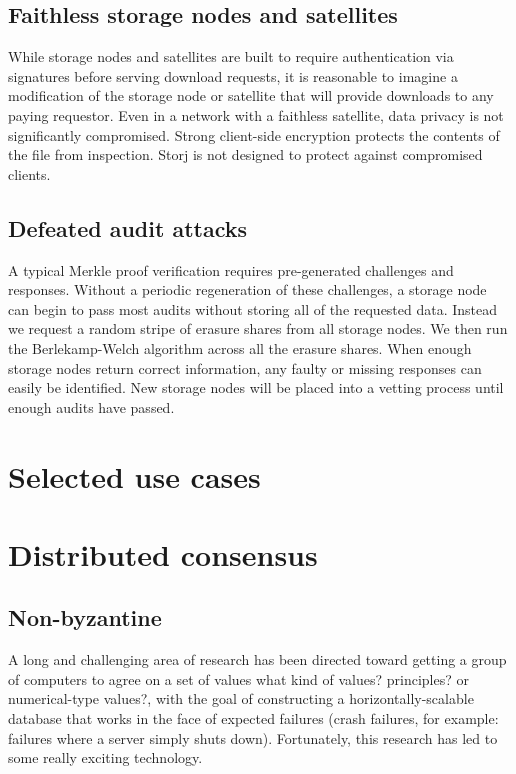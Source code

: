 \documentclass[11pt,fleqn,openany]{book}
\newcommand{\bs}[1]{{\color{red}#1}}
\begin{document}
\section{Faithless storage nodes and satellites}

While storage nodes and satellites are built to require authentication via
signatures before serving download requests, it is reasonable to imagine a
modification of the storage node or satellite that will provide downloads to
any paying requestor.
Even in a network with a faithless satellite, data privacy is not significantly
compromised.
Strong client-side encryption protects the contents of the file from
inspection.
Storj is not designed to protect against compromised clients.

\section{Defeated audit attacks}

A typical Merkle proof verification requires pre-generated challenges and
responses.
Without a periodic regeneration of these challenges, a storage node can begin
to pass most audits without storing all of the requested data.
Instead we request a random stripe of erasure shares from all storage nodes.
We then run the Berlekamp-Welch algorithm\cite{berlekamp-welch} across all the
erasure shares.
When enough storage nodes return correct information, any faulty or missing
responses can easily be identified.
New storage nodes will be placed into a vetting process until enough audits
have passed.

\chapter{Selected use cases}





\chapter{Distributed consensus}

\section{Non-byzantine}

A long and challenging area of research has been directed toward getting a
group of computers to agree on a set of values
\bs{what kind of values? principles? or numerical-type values?},
with the goal of constructing a
horizontally-scalable database that works in the face of expected failures
(crash failures, for example: failures where a server simply shuts down).
Fortunately, this research has led to some really exciting technology.
\end{document}
